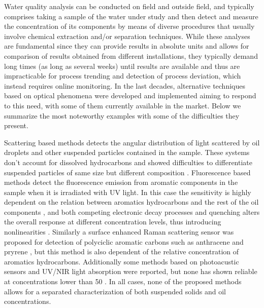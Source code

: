 \documentclass[9pt,twocolumn,twoside]{osajnl}
\begin{document}
Water quality analysis can be conducted on field and outside field, and typically comprises taking a sample of the water under study and then detect and measure the concentration of its components by means of diverse procedures that usually involve chemical extraction and/or separation techniques. While these analyses are fundamental since they can provide results in absolute units and allows for comparison of results obtained from different installations, they typically demand long times (as long as several weeks) until results are available and thus are impracticable for process trending and detection of process deviation, which instead requires online monitoring. In the last decades, alternative techniques based on optical phenomena were developed and implemented aiming to respond to this need, with some of them currently available in the market. Below we summarize the most noteworthy examples with some of the difficulties they present.

Scattering based methods detects the angular distribution of light scattered by oil droplets and other suspended particles contained in the sample. These systems don't account for dissolved hydrocarbons and showed difficulties to differentiate suspended particles of same size but different composition \cite{He2003}. Fluorescence based methods detect the fluorescence emission from aromatic components in the sample when it is irradiated with UV light. In this case the sensitivity is highly dependent on the relation between aromatics hydrocarbons and the rest of the oil components \cite[ch. 4]{Parker1987}, and both competing electronic decay processes and quenching alters the overall response at different concentration levels, thus introducing nonlinearities \cite{Downare1995}. Similarly a surface enhanced Raman scattering sensor was proposed for detection of polyciclic aromatic carbons such as anthracene and pryrene \cite{Kolomijeca2011}, but this method is also dependent of the relative concentration of aromatics hydrocarbons. Additionally some methods based on photoacustic sensors and UV/NIR light absorption were reported, but none has shown reliable at concentrations lower than \SI{50}{\ppm} \cite{Freeborn1998,He2003}. In all cases, none of the proposed methods allows for a separated characterization of both suspended solids and oil concentrations.
\end{document}
